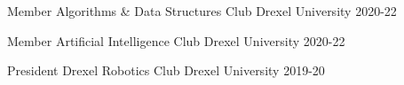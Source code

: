 
\begin{cvhonors}

  \cvhonor
  {Member}
  {Algorithms \& Data Structures Club}
  {Drexel University} 
  {2020-22}

  \cvhonor
  {Member}
  {Artificial Intelligence Club}
  {Drexel University}
  {2020-22}
  
  \cvhonor
  {President}
  {Drexel Robotics Club}
  {Drexel University}
  {2019-20}

\end{cvhonors}
